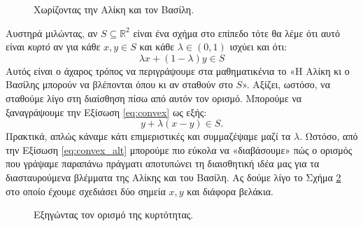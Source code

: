 \documentclass[11pt,a4paper]{article}
\newcommand{\R}{\mathbb{R}}
\theoremstyle{definition}
\begin{document}
	\begin{figure}[!htb]
		\centering
		\caption{Χωρίζοντας την Αλίκη και τον Βασίλη.}
		\label{fig:3}
	\end{figure}

	Αυστηρά μιλώντας, αν $S\subseteq\R^2$ είναι ένα σχήμα στο επίπεδο τότε θα λέμε ότι αυτό είναι \textit{κυρτό} αν για κάθε $x,y\in S$ και κάθε $\lambda\in(0,1)$ ισχύει και ότι:
	\begin{equation}\label{eq:convex}
	\lambda x+(1-\lambda)y\in S
	\end{equation}
	Αυτός είναι ο άχαρος τρόπος να περιγράψουμε στα μαθηματικένια το «Η Αλίκη κι ο Βασίλης μπορούν να βλέπονται όπου κι αν σταθούν στο $S$». Αξίζει, ωστόσο, να σταθούμε λίγο στη διαίσθηση πίσω από αυτόν τον ορισμό. Μπορούμε να ξαναγράψουμε την Εξίσωση \eqref{eq:convex} ως εξής:
	\begin{equation}\label{eq:convex_alt}
	y+\lambda(x-y)\in S.
	\end{equation}
	Πρακτικά, απλώς κάναμε κάτι επιμεριστικές και συμμαζέψαμε μαζί τα $\lambda$. Ωστόσο, από την Εξίσωση \eqref{eq:convex_alt} μπορούμε πιο εύκολα να «διαβάσουμε» πώς ο ορισμός που γράψαμε παραπάνω πράγματι αποτυπώνει τη διαισθητική ιδέα μας για τα διασταυρούμενα βλέμματα της Αλίκης και του Βασίλη. Ας δούμε λίγο το Σχήμα \ref{fig:4} στο οποίο έχουμε σχεδιάσει δύο σημεία $x,y$ και διάφορα βελάκια.
	
	\begin{figure}[!htb]
		\centering
		\caption{Εξηγώντας τον ορισμό της κυρτότητας.}
		\label{fig:4}
	\end{figure}
\end{document}

